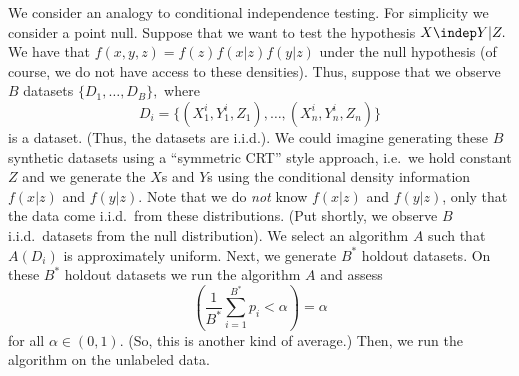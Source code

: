 \documentclass[12pt]{article}
\begin{document}
We consider an analogy to conditional independence testing. For simplicity we consider a point null. Suppose that we want to test the hypothesis $X \indep Y | Z.$ We have that $f(x,y,z) = f(z) f(x|z) f(y|z)$ under the null hypothesis (of course, we do not have access to these densities). Thus, suppose that we observe $B$ datasets $\{ D_1, \dots, D_B \},$ where $$D_i = \{ (X_1^i, Y_1^i, Z_1), \dots, (X_n^i, Y_n^i, Z_n)\}$$ is a dataset. (Thus, the datasets are i.i.d.). We could imagine generating these $B$ synthetic datasets using a ``symmetric CRT'' style approach, i.e.\ we hold constant $Z$ and we generate the $X$s and $Y$s using the conditional density information $f(x|z)$ and $f(y|z)$. Note that we do \textit{not} know $f(x|z)$ and $f(y|z)$, only that the data come i.i.d.\ from these distributions. (Put shortly, we observe $B$ i.i.d.\ datasets from the null distribution). We select an algorithm $A$ such that $A(D_i)$ is approximately uniform. Next, we generate $B^*$ holdout datasets. On these $B^*$ holdout datasets we run the algorithm $A$ and assess
$$\left(\frac{1}{B^*} \sum_{i=1}^{B^*} p_i < \alpha\right) = \alpha$$
for all $\alpha \in (0,1).$ (So, this is another kind of average.) Then, we run the algorithm on the unlabeled data.
\end{document}
